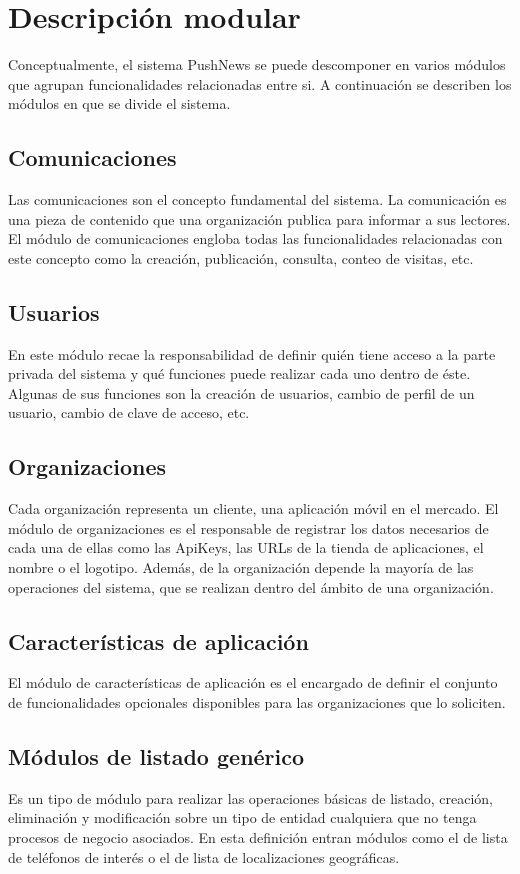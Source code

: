 \section{Descripción modular}
Conceptualmente, el sistema PushNews se puede descomponer en varios módulos que agrupan funcionalidades relacionadas entre si. A continuación se describen los módulos en que se divide el sistema.

\subsection*{Comunicaciones}
Las comunicaciones son el concepto fundamental del sistema. La comunicación es una pieza de contenido que una organización publica para informar a sus lectores. El módulo de comunicaciones engloba todas las funcionalidades relacionadas con este concepto como la creación, publicación, consulta, conteo de visitas, etc.

\subsection*{Usuarios}
En este módulo recae la responsabilidad de definir quién tiene acceso a la parte privada del sistema y qué funciones puede realizar cada uno dentro de éste. Algunas de sus funciones son la creación de usuarios, cambio de perfil de un usuario, cambio de clave de acceso, etc.

\subsection*{Organizaciones}
Cada organización representa un cliente, una aplicación móvil en el mercado. El módulo de organizaciones es el responsable de registrar los datos necesarios de cada una de ellas como las ApiKeys, las URLs de la tienda de aplicaciones, el nombre o el logotipo. Además, de la organización depende la mayoría de las operaciones del sistema, que se realizan dentro del ámbito de una organización.

\subsection*{Características de aplicación}
El módulo de características de aplicación es el encargado de definir el conjunto de funcionalidades opcionales disponibles para las organizaciones que lo soliciten.

\subsection*{Módulos de listado genérico}
Es un tipo de módulo para realizar las operaciones básicas de listado, creación, eliminación y modificación sobre un tipo de entidad cualquiera que no tenga procesos de negocio asociados. En esta definición entran módulos como el de lista de teléfonos de interés o el de lista de localizaciones geográficas.

